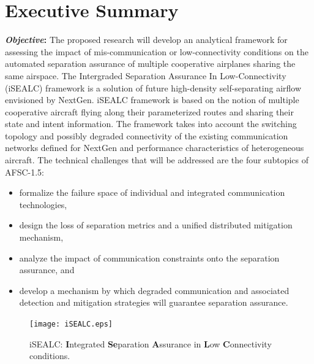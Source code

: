 \documentclass[letter,onecolumn,12pt]{aiaa-tc}
\newcommand{\1}{1_n}
\begin{document}
\pagestyle{empty}
\section*{Executive Summary}  %

\textbf{\emph{Objective}:} The proposed research will develop an analytical framework for assessing the impact
of mis-communication or low-connectivity conditions on the automated separation assurance of multiple cooperative
airplanes sharing the same airspace. The Intergraded Separation Assurance In Low-Connectivity (iSEALC) framework
is a solution of future high-density self-separating airflow envisioned by NextGen. iSEALC framework is based on
the notion of  multiple cooperative aircraft flying along their parameterized routes and sharing their state
and intent information. The framework takes into account the switching topology and possibly degraded connectivity
of the existing communication networks defined for NextGen and performance characteristics of heterogeneous aircraft.
The technical challenges that will be addressed are the four subtopics of AFSC-1.5:
\vspace{-2mm}
\begin{itemize}
\setlength{\itemsep}{-4pt}
    \item formalize the failure space of individual and integrated communication technologies,
    \item design the loss of separation metrics and a unified distributed mitigation mechanism,
    \item analyze the impact of  communication constraints onto the separation assurance, and
    \item develop a mechanism by which degraded communication and associated detection and mitigation strategies will guarantee separation assurance.
\end{itemize}
\vspace{-2mm}
\begin{figure}
\centering
\vspace{-0mm}
\texttt{[image: iSEALC.eps]}
\caption*{\footnotesize iSEALC: \textbf{I}ntegrated \textbf{Se}paration \textbf{A}ssurance in \textbf{L}ow \textbf{C}onnectivity conditions.}
\label{fig:ISEALC}
\end{figure}
\vspace{-1mm}
\end{document}
